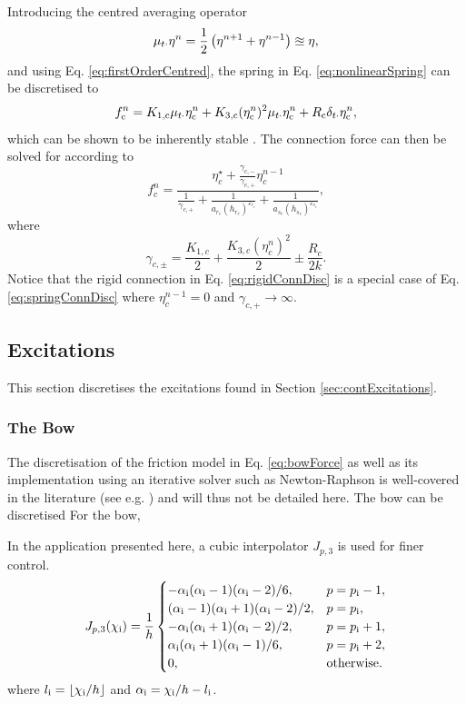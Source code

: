 \documentclass{article}
\begin{document}
Introducing the centred averaging operator
\begin{align}
    \mu_{t\cdot} \eta^n = \frac{1}{2}\left(\eta^{n+1}+\eta^{n-1}\right)\approxeq \eta,
\end{align}
and using Eq. \eqref{eq:firstOrderCentred}, the spring in Eq. \eqref{eq:nonlinearSpring} can be discretised to
\begin{equation}\label{eq:nonlinearSpringDisc}
    f_{\text{c}}^n = K_{1,\text{c}}\mu_{t\cdot}\eta_{\text{c}}^n + K_{3,\text{c}}(\eta_{\text{c}}^n)^2\mu_{t\cdot}\eta_{\text{c}}^n + R_{\text{c}}\delta_{t\cdot} \eta_{\text{c}}^n,
\end{equation}
which can be shown to be inherently stable \cite{theBible, Bilbao2009Modular}. The connection force can then be solved for according to
\begin{equation}\label{eq:springConnDisc}
    f_c^n = \frac{\eta_c^\star + \frac{\gamma_{c,-}}{\gamma_{c,+}}\eta_c^{n-1}}{\frac{1}{\gamma_{c,+}} + \frac{1}{a_{r_c}(h_{r_c})^{\varepsilon_{r_c}}}+ \frac{1}{a_{s_c}(h_{s_c})^{\varepsilon_{s_c}}}},
\end{equation}
where 
\begin{equation}
    \gamma_{c,\pm} = \frac{K_{1, c}}{2} + \frac{K_{3,c}(\eta_c^n)^2}{2} \pm \frac{R_c}{2k}.
\end{equation}
Notice that the rigid connection in Eq. \eqref{eq:rigidConnDisc} is a special case of Eq. \eqref{eq:springConnDisc} where $\eta^{n-1}_c = 0$ and $\gamma_{c, +} \rightarrow \infty$.
\subsection{Excitations}\label{sec:discExcitations}
This section discretises the excitations found in Section \ref{sec:contExcitations}. 

\subsubsection{The Bow}
The discretisation of the friction model in Eq. \eqref{eq:bowForce} as well as its implementation using an iterative solver such as Newton-Raphson is well-covered in the literature (see e.g. \cite[Ch. 8]{WillemsenThesis})
and will thus not be detailed here. 
The bow can be discretised  For the bow, 

In the application presented here, a cubic interpolator $J_{p,3}$ is used for finer control.
\begin{equation}\label{eq:cubicJ}
    J_{p,3}(\chi_{\text{i}}) = \frac{1}{h}\begin{cases}
        -\alpha_{\text{i}} (\alpha_{\text{i}}-1)(\alpha_{\text{i}}-2)/6, & p = p_{\text{i}}-1,\\
        (\alpha_{\text{i}}-1)(\alpha_{\text{i}}+1)(\alpha_{\text{i}}-2)/2,  & p = p_{\text{i}},\\
        -\alpha_{\text{i}} (\alpha_{\text{i}}+1)(\alpha_{\text{i}}-2)/2, & p = p_{\text{i}} + 1,\\
        \alpha_{\text{i}} (\alpha_{\text{i}}+1)(\alpha_{\text{i}}-1)/6, & p = p_{\text{i}} + 2,\\
        0, & \text{otherwise.}
    \end{cases}
\end{equation}
where $l_\itxt = \floor[\chi_\itxt / h]$ and $\alpha_{\text{i}} = \chi_{\text{i}} /h - l_{\text{i}}$.
\end{document}
